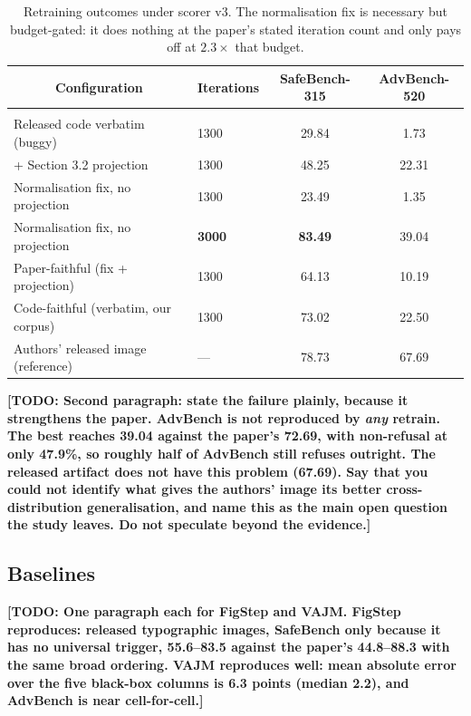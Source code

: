 \documentclass[10pt]{article} %
\newcommand{\todo}[1]{\textbf{[TODO: #1]}}
\begin{document}
\begin{table}[t]
\caption{Retraining outcomes under scorer v3. The normalisation fix is necessary but budget-gated:
it does nothing at the paper's stated iteration count and only pays off at $2.3\times$ that budget.}
\label{tab:budget}
\begin{center}
\begin{tabular}{llcc}
\multicolumn{1}{c}{\bf Configuration} & \multicolumn{1}{c}{\bf Iterations} & \multicolumn{1}{c}{\bf SafeBench-315} & \multicolumn{1}{c}{\bf AdvBench-520}
\\ \hline \\
Released code verbatim (buggy)        & 1300 & 29.84 & 1.73 \\
\quad + Section 3.2 projection        & 1300 & 48.25 & 22.31 \\
Normalisation fix, no projection      & 1300 & 23.49 & 1.35 \\
Normalisation fix, no projection      & {\bf 3000} & {\bf 83.49} & 39.04 \\
Paper-faithful (fix + projection)     & 1300 & 64.13 & 10.19 \\
Code-faithful (verbatim, our corpus)  & 1300 & 73.02 & 22.50 \\
Authors' released image (reference)   & ---  & 78.73 & 67.69 \\
\end{tabular}
\end{center}
\end{table}

\todo{Second paragraph: state the failure plainly, because it strengthens the paper. AdvBench is not reproduced by \emph{any} retrain. The best reaches 39.04 against the paper's 72.69, with non-refusal at only 47.9\%, so roughly half of AdvBench still refuses outright. The released artifact does not have this problem (67.69). Say that you could not identify what gives the authors' image its better cross-distribution generalisation, and name this as the main open question the study leaves. Do not speculate beyond the evidence.}

\subsection{Baselines}
\label{sec:results-baselines}

\todo{One paragraph each for FigStep and VAJM. FigStep reproduces: released typographic images, SafeBench only because it has no universal trigger, 55.6--83.5 against the paper's 44.8--88.3 with the same broad ordering. VAJM reproduces well: mean absolute error over the five black-box columns is 6.3 points (median 2.2), and AdvBench is near cell-for-cell.}
\end{document}
